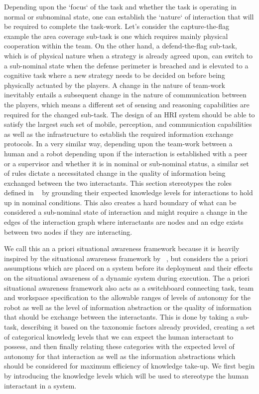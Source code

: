 \documentclass[letterpaper, 10 pt, conference]{ieeeconf}  %
\theoremstyle{definition}
\newcommand{\citet}[1]{\citeauthor{#1}~\cite{#1}}
\begin{document}
Depending upon the `focus` of the task and whether the task is operating in normal or subnominal
state, one can establish the `nature` of interaction that will be required to complete the
task-work. Let's consider the capture-the-flag example the area coverage sub-task is one which
requires mainly physical cooperation within the team. On the other hand, a defend-the-flag
sub-task, which is of physical nature when a strategy is already agreed upon, can switch to a
sub-nominal state when the defense perimeter is breached and is elevated to a cognitive task
where a new strategy needs to be decided on before being physically actuated by the players. A
change in the nature of team-work inevitably entails a subsequent change in the nature of
communication between the players, which means a different set of sensing and reasoning capabilities
are required for the changed sub-task. The design of an HRI system should be able to satisfy the
largest such set of mobile, perception, and communication capabilities as well as the infrastructure
to establish the required information exchange protocols. In a very similar way, depending upon the
team-work between a human and a robot depending upon if the interaction is established with a peer
or a supervisor and whether it is in nominal or sub-nominal status, a similar set of rules dictate a
necessitated change in the quality of information being exchanged between the two interactants. This
section stereotypes the roles defined in \citet{Goodrich2007,Scholtz2003} by grounding their
expected knowledge levels for interactions to hold up in nominal conditions. This also creates a
hard boundary of what can be considered a sub-nominal state of interaction and might require a
change in the edges of the interaction graph where interactants are nodes and an edge exists
between two nodes if they are interacting.

We call this an a priori situational awareness framework because it is heavily inspired by the
situational awareness framework by \citet{Endsley1995}, but considers the a priori assumptions which
are placed on a system before its deployment and their effects on the situational awareness of a
dynamic system during execution. The a priori situational awareness framework also acts as a
switchboard connecting task, team and workspace specification to the allowable ranges of levels
of autonomy for the robot as well as the level of information abstraction or the quality of
information that should be exchange between the interactants. This is done by taking a sub-task,
describing it based on the taxonomic factors already provided, creating a set of categorical
knowledg levels that we can expect the human interactant to possess, and then finally relating
these categories with the expected level of autonomy for that interaction as well as the
information abstractions which should be considered for maximum efficiency of knowledge take-up.
We first begin by introducing the knowledge levels which will be used to stereotype the human
interactant in a system.
\end{document}
